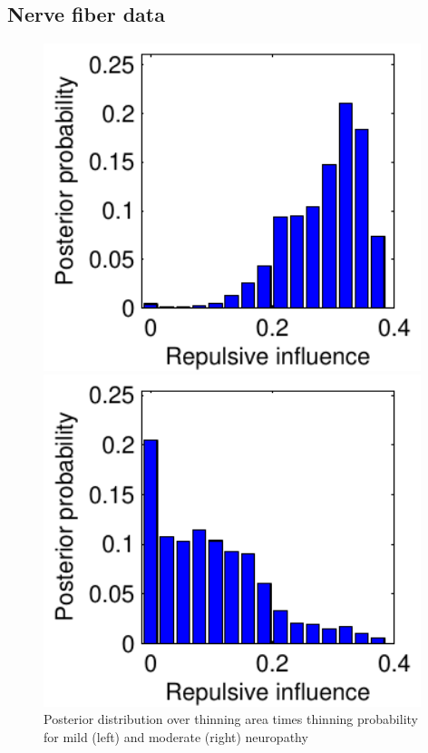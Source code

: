 \documentclass{statsoc}
\begin{document}
\subsection{Nerve fiber data}
  \begin{figure}
  \centering
  \begin{minipage}[h]{0.22\linewidth}
    \centering \vspace{-.1in}
  \caption{Posterior distribution over thinning area times thinning probability for mild (left) and moderate (right) neuropathy}
  \label{fig:rep_inf}
  \end{minipage}
  \begin{minipage}[h]{0.3\linewidth}
  \centering
  \includegraphics[width=0.98\textwidth]{figs/plot_mild_repuls.pdf}
  \end{minipage}
  \begin{minipage}[h]{0.3\linewidth}
  \centering
  \includegraphics[width=0.98\textwidth]{figs/plot_mod_repuls.pdf}
  \end{minipage}
  \end{figure}
\end{document}
